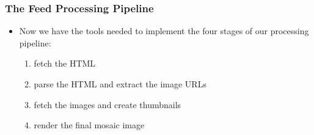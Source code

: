 \documentclass{beamer}
\begin{document}
\begin{frame}[fragile]
\frametitle{The Feed Processing Pipeline}
\begin{itemize}
\item Now we have the tools needed to implement the four stages of our processing
pipeline:
\begin{enumerate}
\item fetch the HTML
\item parse the HTML and extract the image URLs
\item fetch the images and create thumbnails
\item render the final mosaic image
\end{enumerate}
\end{itemize}
\end{frame}
\end{document}
